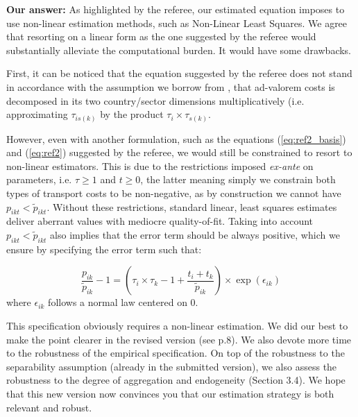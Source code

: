 \documentclass[a4paper,11pt]{article}
\begin{document}
\textbf{Our answer:} As highlighted by the referee, our estimated equation imposes to use non-linear estimation methods, such as Non-Linear Least Squares. We agree that resorting on a linear form as the one suggested by the referee would substantially alleviate the computational burden. It would have some drawbacks.

First, it can be noticed that the equation suggested by the referee does not stand in accordance with the assumption we borrow from \cite{Irrazabal_2015}, that ad-valorem costs is decomposed in its two country/sector dimensions multiplicatively (i.e. approximating $\tau_{is(k)}$ by the product $\tau_i\times \tau_{s(k)}$.

However, even with another formulation, such as the equations (\ref{eq:ref2_basis}) and (\ref{eq:ref2}) suggested by the referee, we would still be constrained to resort to non-linear estimators. This is due to the restrictions imposed \textit{ex-ante} on parameters, i.e. $\tau \geq 1$ and $t\geq 0$, the latter meaning simply we constrain both types of transport costs to be non-negative, as by construction we cannot have $p_{ikt} < \widetilde{p}_{ikt}$. Without these restrictions, standard linear, least squares estimates deliver aberrant values with mediocre quality-of-fit. Taking into account $p_{ikt} < \widetilde{p}_{ikt}$ also implies that the error term should be always positive, which we ensure by specifying the error term such that:

\begin{equation*}
\frac{p_{ik}}{\widetilde{p}_{ik}}-1 =\left(\tau_{i}\times \tau_{k} -1+\frac{t_{i} + t_{k}}{\widetilde{p}_{ik}} \right)\times \exp(\epsilon_{ik})
\end{equation*}
\noindent where $\epsilon_{ik}$ follows a normal law centered on 0.

This specification obviously requires a non-linear estimation. We did our best to make the point clearer in the revised version (see p.8). We also devote more time to the robustness of the empirical specification. On top of the robustness to the separability assumption (already in the submitted version), we also assess the robustness to the degree of aggregation and endogeneity (Section 3.4). We hope that this new version now convinces you that our estimation strategy is both relevant and robust.



\newpage


\end{document}
